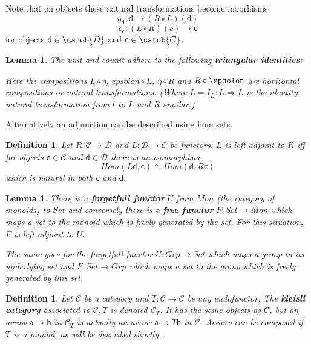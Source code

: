 \documentclass{article}
\newcommand{\cat}[1]{\mathcal{#1}} %
\newcommand{\ob}[1]{\mathsf{#1}} %
\newtheorem{lemma}[theorem]{Lemma}
\newtheorem{definition}[theorem]{Definition}
\begin{document}
Note that on objects these natural transformations become moprhisms
$$\eta_\ob{d}: \ob{d} \rightarrow (R \circ L)(\ob{d})$$
$$\epsilon_\ob{c}: (L \circ R)(c) \rightarrow \ob{c}$$
for objects $\ob{d} \in \catob{D}$ and $\ob{c} \in \catob{C}$.

\begin{lemma}
	The unit and counit adhere to the following \textbf{triangular identities}:
	Here the compositions $L \circ \eta$, $epsolon \circ L$, $\eta \circ R$ and $R \circ \epsolon$ are horizontal compositions or natural transformations.
	(Where $L = I_L: L \Rightarrow L$ is the identity natural transformation from $l$ to $L$ and $R$ similar.)
\end{lemma}

Alternatively an adjunction can be described using hom sets:

\begin{definition}
	Let $R: \cat{C} \rightarrow \cat{D}$ and $L: \cat{D} \rightarrow \cat{C}$ be functors. $L$ is left adjoint to $R$ iff for objects $\ob{c} \in \cat{C}$
	and $\ob{d} \in \cat{D}$ there is an isomorphism $$ Hom(L\ob{d}, \ob{c}) \cong Hom(\ob{d}, R\ob{c})$$
	which is natural in both $\ob{c}$ and $\ob{d}$.
\end{definition}

\begin{lemma}
	There is a \textbf{forgetfull functor} $U$ from $Mon$ (the category of monoids) to $Set$ and conversely there is a \textbf{free functor}
	$F: Set \rightarrow Mon$ which maps a set to the monoid which is freely generated by the set.
	For this situation, $F$ is left adjoint to $U$.

	The same goes for the forgetfull functor $U: Grp \rightarrow Set$ which maps a group to its underlying set and $F: Set \rightarrow Grp$ which maps a set to the group which is freely generated by this set.
\end{lemma}

\begin{definition}
	Let $\cat{C}$ be a category and $T: \cat{C} \rightarrow \cat{C}$ be any endofunctor.
	The \textbf{kleisli category} associated to $\cat{C}, T$ is denoted $\cat{C}_T$.
	It has the same objects as $\cat{C}$, but an arrow $\ob{a} \rightarrow \ob{b}$ in $\cat{C}_T$ is actually an arrow $\ob{a} \rightarrow T\ob{b}$ in $\cat{C}$.
	Arrows can be composed if $T$ is a monad, as will be described shortly.
\end{definition}
\end{document}

